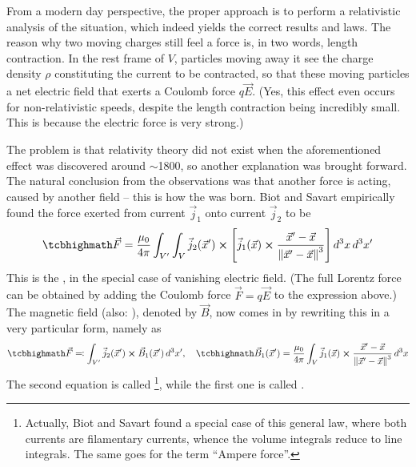 \documentclass[../class_mech_main.tex]{subfiles}
\DeclareMathOperator{\fpmu}{\frac{\mu_0}{4 \pi}}
\begin{document}
From a modern day perspective, the proper approach is to perform a relativistic analysis of the situation, which indeed yields the correct results and laws. The reason why two moving charges still feel a force is, in two words, length contraction. In the rest frame of $V$, particles moving away it see the charge density $\rho$ constituting the current to be contracted, so that these moving particles a net electric field that exerts a Coulomb force $q \vec{E}$. (Yes, this effect even occurs for non-relativistic speeds, despite the length contraction being incredibly small. This is because the electric force is very strong.)


The problem is that relativity theory did not exist when the aforementioned effect was discovered around $\sim$1800, so another explanation was brought forward. The natural conclusion from the observations was that another force is acting, caused by another field -- this is how the  was born. Biot and Savart  empirically found the force exerted from current $\vec{j}_1$ onto current $\vec{j}_2$ to be
\begin{equation}
    \eqbox{
        \vec{F}
        = \fpmu \int_{V'} \int_V \vec{j}_2(\vec{x}') \cross \qty[\vec{j}_1(\vec{x}) \cross \frac{\vec{x}' - \vec{x}}{\norm{\vec{x}' - \vec{x}}^3}] \, d^3x \, d^3x'
    }
\end{equation}
This is the , in the special case of vanishing electric field. (The full Lorentz force can be obtained by adding the Coulomb force $\vec{F} = q \vec{E}$ to the expression above.) The magnetic field  (also: ), denoted by $\vec{B}$, now comes in by rewriting this in a very particular form, namely as
\begin{equation}\label{eq:biot_savart_general}
    \eqbox{
        \vec{F}
        \eqqcolon \int_{V'} \vec{j}_2(\vec{x}') \cross \vec{B}_1(\vec{x}') \, d^3x'
    }
    , \quad
    \eqbox{
        \vec{B}_1(\vec{x}') = \fpmu \int_V \vec{j}_1(\vec{x}) \cross \frac{\vec{x}' - \vec{x}}{\norm{\vec{x}' - \vec{x}}^3} \, d^3x
    }
\end{equation}
The second equation is called \footnote{Actually, Biot and Savart found a special case of this general law, where both currents are filamentary currents, whence the volume integrals reduce to line integrals. The same goes for the term \enquote{Ampere force}.}, while the first one is called .
\end{document}
